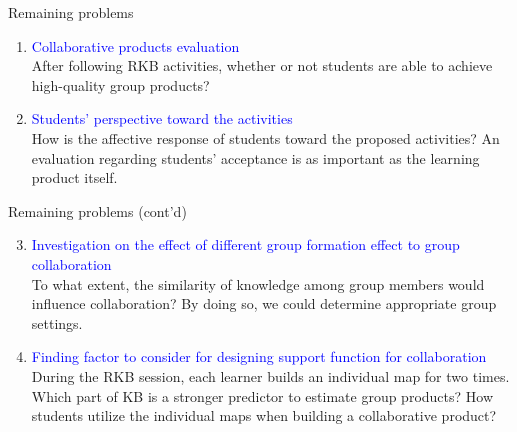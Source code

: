 \begin{frame}{Remaining problems}
    \begin{enumerate}
        \item \textcolor<1>{blue}{Collaborative products evaluation\\} 
        {\small After following RKB activities, 
        whether or not students are able to achieve high-quality group products?}
        
        \item \textcolor<1>{blue}{Students' perspective toward the activities\\} 
        {\small How is the affective response of students toward the proposed activities? An evaluation regarding students' acceptance is as important as the learning product itself. }
        \end{enumerate}
\end{frame}    
\begin{frame}{Remaining problems (cont'd)}
    \begin{enumerate}\setcounter{enumi}{2}
        \item \textcolor<1>{blue}{Investigation on the effect of different group formation effect to group collaboration\\}
        {\small To what extent, the similarity of knowledge among group members would influence collaboration? By doing so, we could determine appropriate group settings.} 
        \item \textcolor<1>{blue}{Finding factor to consider for designing support function for collaboration\\}
        {\small During the RKB session, each learner builds an individual map for two times. Which part of KB is a stronger predictor to estimate group products? How students utilize the individual maps when building a collaborative product?} 
    \end{enumerate}
\end{frame}

